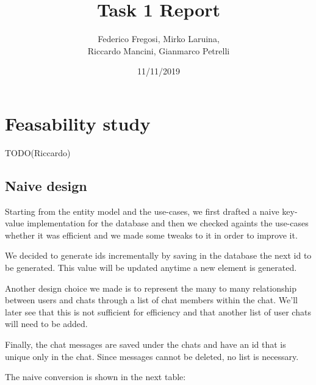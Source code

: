 \documentclass[10pt]{article}
\title{Task 1 Report}
\date{11/11/2019}
\author{Federico Fregosi, Mirko Laruina,\\
        Riccardo Mancini, Gianmarco Petrelli}
\begin{document}
\maketitle
\vfill
\tableofcontents
\vfill
\clearpage
\setcounter{page}{1}

\section{Feasability study}
TODO(Riccardo)
\subsection{Naive design}
Starting from the entity model and the use-cases, we first drafted a naive key-value 
implementation for the database and then we checked againts the use-cases whether 
it was efficient and we made some tweaks to it in order to improve it. 

We decided to generate ids incrementally by saving in the database the next id
to be generated. This value will be updated anytime a new element is generated.

Another design choice we made is to represent the many to many relationship 
between users and chats through a list of chat members within the chat. We'll
later see that this is not sufficient for efficiency and that another list of 
user chats will need to be added.

Finally, the chat messages are saved under the chats and have an id that is 
unique only in the chat. Since messages cannot be deleted, no list is necessary.

The naive conversion is shown in the next table:
\end{document}
